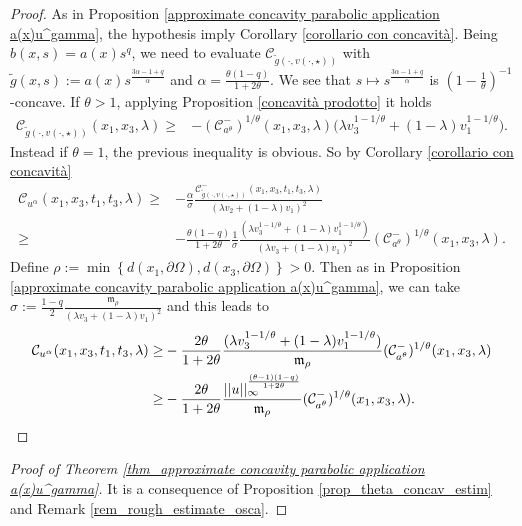 \documentclass[11pt, reqno]{amsart}
\theoremstyle{definition}
\numberwithin{equation}{section}
\begin{document}
\begin{proof}
As in Proposition \ref{approximate concavity parabolic application a(x)u^gamma}, the hypothesis imply Corollary \ref{corollario con concavità}. 
Being $b(x,s)=a(x)s^q$, we need to evaluate
 $\mathcal{C}_{\tilde{g}(\cdot, v(\cdot, \star))}$
 with $\tilde{g}(x,s):= a(x) s^{\frac{3\alpha-1+q}{\alpha}}$ and $\alpha=\frac{\theta(1-q)}{1+2\theta}$.
 We see that $s\mapsto s^{\frac{3\alpha-1+q}{\alpha}}$ is $\left(1-\frac{1}{\theta}\right)^{-1}$-concave.
 If $\theta>1$, applying Proposition \ref{concavità prodotto} it holds 
 \begin{align*}
	\mathcal{C}_{\tilde{g}(\cdot, v(\cdot, \star))} (x_1,x_3,\lambda)\geq
	& -(\mathcal{C}^-_{a^{\theta}})^{1/\theta}(x_1,x_3,\lambda) \big(\lambda v^{1-1/\theta}_3+(1-\lambda) v^{1-1/\theta}_1\big).
\end{align*}
Instead if $\theta=1$, the previous inequality is obvious. So by Corollary \ref{corollario con concavità}
\begin{align*}
 \mathcal{C}_{u^\alpha}(x_1,x_3,t_1,t_3, \lambda)
 \geq&-\frac{\alpha}{\sigma}\frac{\mathcal{C}_{\tilde{g}(\cdot, v(\cdot, \star))}^-
(x_1,x_3,t_1,t_3,\lambda)}{(\lambda v_2+(1-\lambda)v_1)^2}
 \\\geq& -\frac{\theta(1-q)}{1+2\theta}\frac{1}{\sigma}\frac{(\lambda v^{1-1/\theta}_3+(1-\lambda) v^{1-1/\theta}_1)}{(\lambda v_3+(1-\lambda)v_1)^2}(\mathcal{C}^-_{a^{\theta}})^{1/\theta}(x_1,x_3,\lambda).
\end{align*}
Define $ \rho:=\min \left\{d(x_1,\partial\Omega),d(x_3,\partial \Omega)\right\}>0.$
Then as in Proposition \ref{approximate concavity parabolic application a(x)u^gamma}, we can take $\sigma:=\frac{1-q}{2}\frac{ \mathfrak{m}_{\rho} }{(\lambda v_3+(1-\lambda)v_1)^2}$ and this leads to
\begin{align*}
 \mathcal{C}_{u^\alpha}(x_1,x_3,t_1,t_3, \lambda)\geq& -\frac{2\theta}{1+2\theta}\frac{(\lambda v^{1-1/\theta}_3+(1-\lambda) v^{1-1/\theta}_1)}{ \mathfrak{m}_{\rho} }(\mathcal{C}^-_{a^{\theta}})^{1/\theta}(x_1,x_3,\lambda)\\ \geq & -\frac{2\theta}{1+2\theta}\frac{||u||_\infty^{\frac{(\theta-1)(1-q)}{1+2\theta}}}{ \mathfrak{m}_{\rho} }(\mathcal{C}^-_{a^{\theta}})^{1/\theta}(x_1,x_3,\lambda).\qedhere
\end{align*}
\end{proof}

 \begin{proof}[Proof of Theorem \ref{thm_approximate concavity parabolic application a(x)u^gamma}]
 It is a consequence of Proposition \ref{prop_theta_concav_estim} and Remark \ref{rem_rough_estimate_osca}.
 \end{proof}
\end{document}
